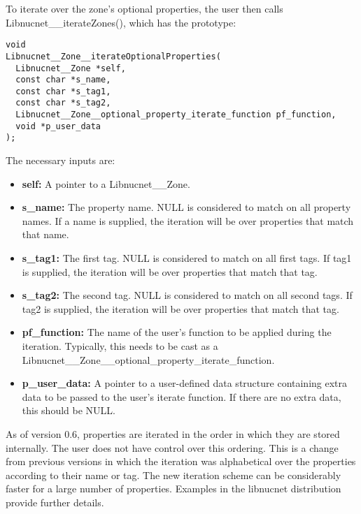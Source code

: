\documentclass{article}    %
\begin{document}
\noindent

To iterate over the zone's optional properties, the user then calls
Libnucnet\_\_iterateZones(), which has the prototype:

\begin{verbatim}
void
Libnucnet__Zone__iterateOptionalProperties(
  Libnucnet__Zone *self,
  const char *s_name,
  const char *s_tag1,
  const char *s_tag2,
  Libnucnet__Zone__optional_property_iterate_function pf_function,
  void *p_user_data
);
\end{verbatim}

\noindent
The necessary inputs are:

\begin{itemize}

\item {\bf self:} A pointer to a Libnucnet\_\_Zone.

\item {\bf s\_name:} The property name.  NULL is considered to match on all
property names.  If a name is supplied, the iteration will be over
properties that match that name.

\item {\bf s\_tag1:} The first tag.  NULL is considered to match on all first
tags.  If tag1 is supplied, the iteration will be over properties that match
that tag.

\item {\bf s\_tag2:} The second tag.  NULL is considered to match on all second
tags.  If tag2 is supplied, the iteration will be over properties that match
that tag.

\item {\bf pf\_function:} The name of the user's function to be applied
during the iteration.
Typically, this needs to be cast as a
Libnucnet\_\_Zone\_\_optional\_property\_iterate\_function.

\item {\bf p\_user\_data:}  A pointer to a user-defined data structure
containing extra data to be passed to the user's iterate function.  If there
are no extra data, this should be NULL.

\end{itemize}

As of version 0.6, properties are iterated in the order in which they are
stored internally.  The user does not have control over this ordering.  This
is a change from previous versions in which the iteration was alphabetical
over the properties according to their name or tag.  The new iteration
scheme can be considerably faster for a large number of properties.
Examples in the libnucnet distribution provide further
details.

%
%
\end{document}
